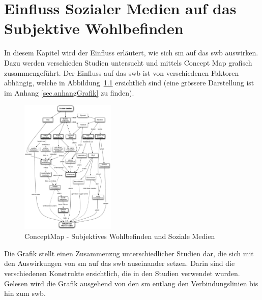 %
%
\thispagestyle{empty}
\chapter{Einfluss Sozialer Medien auf das Subjektive Wohlbefinden}\label{chap.einfluss}
\glsresetall
In diesem Kapitel wird der Einfluss erläutert, wie sich \gls{sm} auf das \gls{swb} auswirken. Dazu werden verschieden Studien untersucht und mittels Concept Map grafisch zusammengeführt. Der Einfluss auf das \gls{swb} ist von verschiedenen Faktoren abhängig, welche in Abbildung~\ref{fig.ConceptMapSwbSm} ersichtlich sind (eine grössere Darstellung ist im Anhang \ref{sec.anhangGrafik} zu finden).
\begin{figure}[h]
	\centering
		\includegraphics[width=0.4\textwidth]{images/grafiken/conceptMap_Swb_Sm_v2.pdf}
	\caption{ConceptMap - Subjektives Wohlbefinden und Soziale Medien}
	\label{fig.ConceptMapSwbSm}
\end{figure} \newline
Die Grafik stellt einen Zusammenzug unterschiedlicher Studien dar, die sich mit den Auswirkungen von \gls{sm} auf das \gls{swb} auseinander setzen. Darin sind die verschiedenen Konstrukte ersichtlich, die in den Studien verwendet wurden. Gelesen wird die Grafik ausgehend von den \gls{sm} entlang den Verbindungslinien bis hin zum \gls{swb}.\newline
